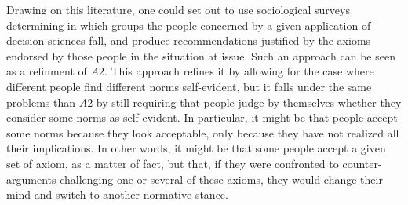 \documentclass[preprint, french, english, 11pt, authoryear]{elsarticle}%
\begin{document}
Drawing on this literature, one could set out to use sociological surveys determining in which groups the people concerned by a given application of decision sciences fall, and produce recommendations justified by the axioms endorsed by those people in the situation at issue. Such an approach can be seen as a refinment of $A2$. This approach refines it by allowing for the case where different people find different norms self-evident, but it falls under the same problems than $A2$ by still requiring that people judge by themselves whether they consider some norms as self-evident. In particular, it might be that people accept some norms because they look acceptable, only because they have not realized all their implications.  In other words, it might be that some people accept a given set of axiom, as a matter of fact, but that, if they were confronted to counter-arguments challenging one or several of these axioms, they would change their mind and switch to another normative stance.
\end{document}
